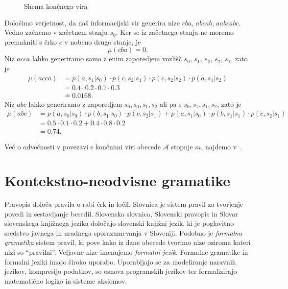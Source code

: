 \documentclass[fin1, tisk]{fmfdelo}
\newcommand{\A}{\mathcal{A}}
\theoremstyle{definition}
\begin{document}
\begin{primer}
\begin{figure}[H]
        \caption{Shema končnega vira}
        \label{fig:FSM}
    \end{figure}
    Določimo verjetnost, da naš informacijski vir generira nize $\mathit{cba}$, $\mathit{abcab}$, 
    $\mathit{aabcabc}$. Vedno začnemo v začetnem stanju $s_0$. Ker se iz začetnega stanja 
    ne moremo premakniti s črko $c$ v nobeno drugo stanje, je
    \[
        \mu(\mathit{cba}) = 0.
    \]
    Niz $\mathit{acca}$ lahko generiramo samo z enim zaporedjem vozlišč 
    $s_0$, $s_1$, $s_2$, $s_2$, $s_1$, zato je
    \begin{align*}
        \mu(\mathit{acca}) &= p(a, s_1|s_0) \cdot p(c, s_2|s_1) \cdot p(c, s_2|s_2) \cdot p(a, s_1|s_2) \\
        &= 0.4 \cdot 0.2 \cdot 0.7 \cdot 0.3 \\
        &\doteq 0.0168.
    \end{align*}
    Niz $\mathit{abc}$ lahko generiramo z zaporedjem $s_0, s_0, s_1, s_2$ ali pa s
    $s_0, s_1, s_1, s_2$, zato je
    \begin{align*}
        \mu(\mathit{abc}) &= p(a, s_0|s_0) \cdot p(b, s_1|s_0) \cdot p(c, s_2|s_1) 
        + p(a, s_1|s_0) \cdot p(b, s_1|s_1) \cdot p(c, s_2|s_1) \\
        &= 0.5 \cdot 0.1 \cdot 0.2 + 0.4 \cdot 0.8 \cdot 0.2 \\
        &\doteq 0.74.
    \end{align*}
\end{primer}

Več o odvečnosti v povezavi s končnimi viri abecede $\A$ stopnje $m$,
najdemo v~\cite{Plotkin1992}.

\section{Kontekstno-neodvisne gramatike}

Pravopis določa pravila o rabi črk in ločil. Slovnica je sistem pravil 
za tvorjenje povedi in sestavljanje besedil. Slovenska slovnica, Slovenski pravopis in Slovar 
slovenskega knjižnega jezika določajo slovenski knjižni jezik, ki je poglavitno sredstvo javnega 
in uradnega sporazumevanja v Sloveniji. Podobno je \emph{formalna gramatika} sistem pravil, ki pove
kako iz dane abecede tvorimo nize oziroma kateri nizi so ``pravilni''. Veljavne nize imenujemo 
\emph{formalni jezik}. Formalne gramatike in formalni jeziki imajo široko uporabo. Uporabljajo se
za modeliranje naravnih jezikov, kompresijo podatkov, so osnova programskih jezikov ter 
formalizirajo matematično logiko in sisteme aksiomov.
\end{document}
